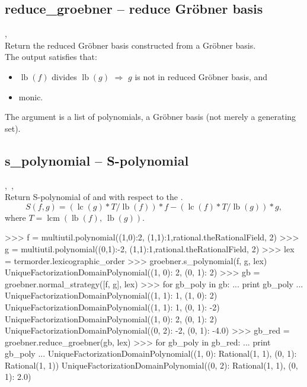   \subsection{reduce\_groebner -- reduce Gr\"obner basis}
   {%
     ,\ 
   }
   {\out{[polynomials]}}\\
   \spacing
   Return the reduced Gr\"obner basis constructed from a Gr\"obner basis.\\
   \spacing
   The output satisfies that:
   \begin{itemize}
   \item \(\operatorname{lb}(f)\) divides \(\operatorname{lb}(g)\) 
     \(\Rightarrow\) \(g\) is not in reduced Gr\"obner basis, and
   \item monic.
   \end{itemize}
   The argument  is a list of polynomials, a Gr\"obner basis (not merely a generating set).\\
%
  \subsection{s\_polynomial -- S-polynomial}
   \func{s\_polynomial}
   {%
     ,\ 
     ,
     }
   {\out{[polynomials]}}\\
   \spacing
   Return S-polynomial of  and 
   with respect to the .\\
   \spacing
   \[S(f, g) = (\operatorname{lc}(g)*T/\operatorname{lb}(f))*f - (\operatorname{lc}(f)*T/\operatorname{lb}(g))*g,\]
    where \(T = \operatorname{lcm}(\operatorname{lb}(f),\ \operatorname{lb}(g))\).
%
%
\begin{ex}
>>> f = multiutil.polynomial({(1,0):2, (1,1):1},rational.theRationalField, 2)
>>> g = multiutil.polynomial({(0,1):-2, (1,1):1},rational.theRationalField, 2)
>>> lex = termorder.lexicographic_order
>>> groebner.s_polynomial(f, g, lex)
UniqueFactorizationDomainPolynomial({(1, 0): 2, (0, 1): 2})
>>> gb = groebner.normal_strategy([f, g], lex)
>>> for gb_poly in gb:
...     print gb_poly
...
UniqueFactorizationDomainPolynomial({(1, 1): 1, (1, 0): 2})
UniqueFactorizationDomainPolynomial({(1, 1): 1, (0, 1): -2})
UniqueFactorizationDomainPolynomial({(1, 0): 2, (0, 1): 2})
UniqueFactorizationDomainPolynomial({(0, 2): -2, (0, 1): -4.0})
>>> gb_red = groebner.reduce_groebner(gb, lex)
>>> for gb_poly in gb_red:
...     print gb_poly
...
UniqueFactorizationDomainPolynomial({(1, 0): Rational(1, 1), (0, 1): Rational(1, 1)})
UniqueFactorizationDomainPolynomial({(0, 2): Rational(1, 1), (0, 1): 2.0})
\end{ex}



